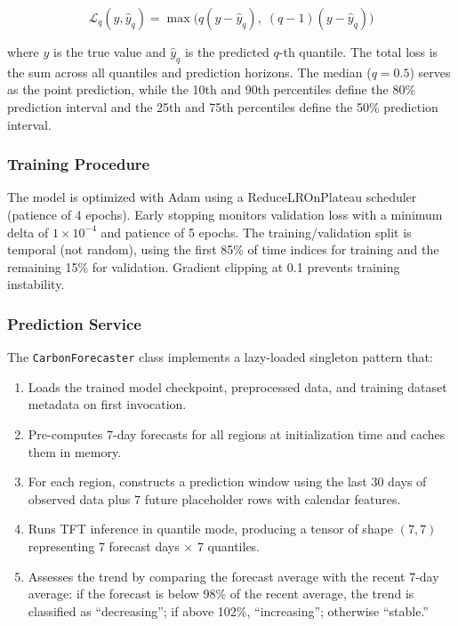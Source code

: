 \documentclass[12pt]{article}
\begin{document}
\begin{equation}
\mathcal{L}_q(y, \hat{y}_q) = \max\big(q(y - \hat{y}_q), \; (q-1)(y - \hat{y}_q)\big)
\label{eq:quantile_loss}
\end{equation}

\noindent where $y$ is the true value and $\hat{y}_q$ is the predicted $q$-th quantile. The total loss is the sum across all quantiles and prediction horizons. The median ($q = 0.5$) serves as the point prediction, while the 10th and 90th percentiles define the 80\% prediction interval and the 25th and 75th percentiles define the 50\% prediction interval.

\subsubsection{Training Procedure}

The model is optimized with Adam using a ReduceLROnPlateau scheduler (patience of 4 epochs). Early stopping monitors validation loss with a minimum delta of $1 \times 10^{-4}$ and patience of 5 epochs. The training/validation split is temporal (not random), using the first 85\% of time indices for training and the remaining 15\% for validation. Gradient clipping at 0.1 prevents training instability.

\subsubsection{Prediction Service}

The \texttt{CarbonForecaster} class implements a lazy-loaded singleton pattern that:

\begin{enumerate}
    \item Loads the trained model checkpoint, preprocessed data, and training dataset metadata on first invocation.
    \item Pre-computes 7-day forecasts for all regions at initialization time and caches them in memory.
    \item For each region, constructs a prediction window using the last 30 days of observed data plus 7 future placeholder rows with calendar features.
    \item Runs TFT inference in quantile mode, producing a tensor of shape $(7, 7)$ representing 7 forecast days $\times$ 7 quantiles.
    \item Assesses the trend by comparing the forecast average with the recent 7-day average: if the forecast is below 98\% of the recent average, the trend is classified as ``decreasing''; if above 102\%, ``increasing''; otherwise ``stable.''
\end{enumerate}
\end{document}
